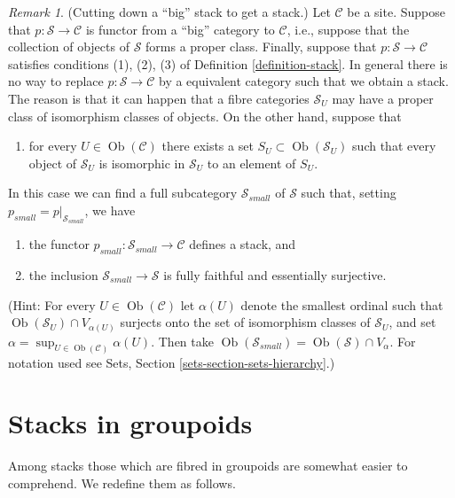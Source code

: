 \documentclass{stacks-project}
\theoremstyle{plain}
\theoremstyle{definition}
\theoremstyle{remark}
\newtheorem{remark}[subsection]{Remark}
\numberwithin{equation}{subsection}
\def\Ob{\mathop{\mathrm{Ob}}\nolimits}
\begin{document}
\begin{remark}
\label{remark-stack-make-small}
(Cutting down a ``big'' stack to get a stack.)
Let $\mathcal{C}$ be a site. Suppose that $p : \mathcal{S} \to \mathcal{C}$
is functor from a ``big'' category to $\mathcal{C}$, i.e., suppose
that the collection of objects of $\mathcal{S}$ forms a proper class.
Finally, suppose that $p : \mathcal{S} \to \mathcal{C}$ satisfies
conditions (1), (2), (3) of
Definition \ref{definition-stack}.
In general there is no way to replace $p : \mathcal{S} \to \mathcal{C}$
by a equivalent category such that we obtain a stack. The reason is that
it can happen that a fibre categories $\mathcal{S}_U$ may have a proper
class of isomorphism classes of objects.
On the other hand, suppose that
\begin{enumerate}
\item[(4)] for every $U \in \Ob(\mathcal{C})$ there exists a set
$S_U \subset \Ob(\mathcal{S}_U)$ such that every object of
$\mathcal{S}_U$ is isomorphic in $\mathcal{S}_U$ to an element of $S_U$.
\end{enumerate}
In this case we can find a full subcategory $\mathcal{S}_{small}$
of $\mathcal{S}$ such that, setting $p_{small} = p|_{\mathcal{S}_{small}}$,
we have
\begin{enumerate}
\item[(a)] the functor $p_{small} : \mathcal{S}_{small} \to \mathcal{C}$
defines a stack, and
\item[(b)] the inclusion $\mathcal{S}_{small} \to \mathcal{S}$
is fully faithful and essentially surjective.
\end{enumerate}
(Hint: For every $U \in \Ob(\mathcal{C})$
let $\alpha(U)$ denote the smallest ordinal such that
$\Ob(\mathcal{S}_U) \cap V_{\alpha(U)}$ surjects onto the set
of isomorphism classes of $\mathcal{S}_U$, and set
$\alpha = \sup_{U \in \Ob(\mathcal{C})} \alpha(U)$.
Then take
$\Ob(\mathcal{S}_{small}) = \Ob(\mathcal{S}) \cap V_\alpha$.
For notation used see Sets, Section \ref{sets-section-sets-hierarchy}.)
\end{remark}







\section{Stacks in groupoids}
\label{section-stacks-in-groupoids}

\noindent
Among stacks those which are fibred in groupoids are somewhat easier
to comprehend. We redefine them as follows.
\end{document}

